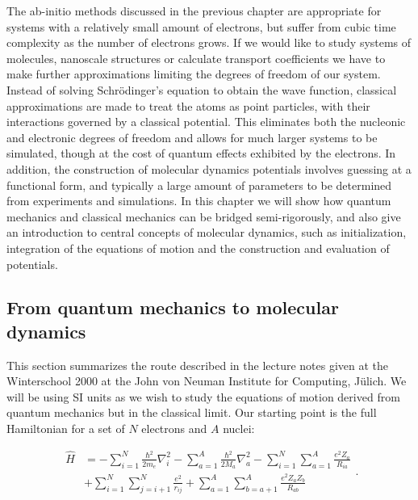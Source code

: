 The ab-initio methods discussed in the previous chapter
are appropriate for systems with a relatively small amount of electrons,
but suffer from cubic time complexity as the number of electrons grows.
If we would like to study systems of molecules, nanoscale structures
or calculate transport coefficients we have to make further approximations
limiting the degrees of freedom of our system.
Instead of solving Schr\"{o}dinger's equation to obtain
the wave function, classical approximations are made to
treat the atoms as point particles, with their interactions
governed by a classical potential. This eliminates both the nucleonic
and electronic degrees of freedom and allows for much larger systems
to be simulated, though at the cost of quantum effects
exhibited by the electrons. In addition, the construction
of molecular dynamics potentials involves guessing at a functional
form, and typically a large amount of parameters to be determined
from experiments and simulations.
In this chapter we will show how quantum mechanics
and classical mechanics can be bridged semi-rigorously,
and also give an introduction to central concepts of molecular dynamics,
such as initialization, integration of the equations of motion
and the construction and evaluation of potentials.

\subsection{From quantum mechanics to molecular dynamics}
This section summarizes the route described in the lecture notes
\parencite[Marx, Dominik and Hutter, J\"{o}rg][pages 1-10]{marx2000}
given at the Winterschool 2000 at the John von Neuman Institute
for Computing, J\"{u}lich.
We will be using SI units as we wish to study the equations of motion
derived from quantum mechanics but in the classical limit.
Our starting point is the full Hamiltonian 
for a set of $N$ electrons and $A$ nuclei:

\begin{equation}
    \begin{split}
        \hat{H}
        &= -\sum_{i=1}^N \frac{\hbar^2}{2m_e} \nabla_i^2
        -\sum_{a=1}^A \frac{\hbar^2}{2M_a} \nabla_a^2
        -\sum_{i=1}^N \sum_{a=1}^A \frac{e^2 Z_a}{R_{ia}} \\
        &+ \sum_{i=1}^N \sum_{j=i+1}^N \frac{e^2}{r_{ij}}
        + \sum_{a=1}^A \sum_{b=a+1}^A \frac{e^2 Z_a Z_b}{R_{ab}}
    \end{split} .
\end{equation}

